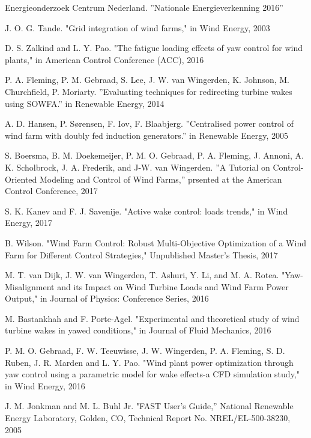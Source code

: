 \begin{thebibliography}{99} %

Energieonderzoek Centrum Nederland. ''Nationale Energieverkenning 2016''

J. O. G. Tande. "Grid integration of wind farms," in Wind Energy, 2003

D. S. Zalkind and L. Y. Pao. "The fatigue loading effects of yaw control for wind plants," in American Control Conference (ACC), 2016
 
P. A. Fleming, P. M. Gebraad, S. Lee, J. W. van Wingerden, K. Johnson, M. Churchfield, P. Moriarty. ''Evaluating techniques for redirecting turbine wakes using SOWFA.'' in Renewable Energy, 2014

A. D. Hansen, P. Sørensen, F. Iov, F. Blaabjerg. ''Centralised power control of wind farm with doubly fed induction generators.'' in Renewable Energy, 2005

S. Boersma, B. M. Doekemeijer, P. M. O. Gebraad, P. A. Fleming, J. Annoni,
A. K. Scholbrock, J. A. Frederik, and J-W. van Wingerden. ''A Tutorial on Control-Oriented Modeling and Control of Wind Farms,''
prsented at the American Control Conference, 2017


S. K. Kanev and F. J. Savenije. "Active wake control: loads trends," in Wind Energy, 2017

B. Wilson. "Wind Farm Control: Robust Multi-Objective Optimization of a Wind Farm for Different Control Strategies," Unpublished Master's Thesis, 2017

M. T. van Dijk, J. W. van Wingerden, T. Ashuri, Y. Li, and M. A. Rotea. "Yaw-Misalignment and its Impact on Wind Turbine Loads and Wind Farm Power Output," in Journal of Physics: Conference Series, 2016

M. Bastankhah and F. Porte-Agel. "Experimental and theoretical study of wind turbine wakes in yawed conditions," in Journal of Fluid Mechanics, 2016

P. M. O. Gebraad, F. W. Teeuwisse, J. W. Wingerden, P. A. Fleming, S. D. Ruben, J. R. Marden and L. Y. Pao. "Wind plant power optimization through yaw control using a parametric model for wake effects-a CFD simulation study," in Wind Energy, 2016

J. M. Jonkman and M. L. Buhl Jr. "FAST User's Guide,'' National Renewable Energy Laboratory, Golden, CO, Technical Report No. NREL/EL-500-38230, 2005


\end{thebibliography}
